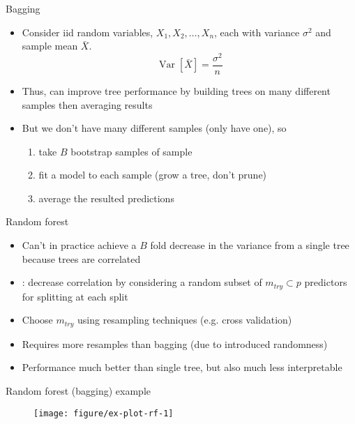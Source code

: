 \documentclass[handout]{beamer}
\begin{document}
\begin{frame}{Bagging}
  
  \begin{itemize}[<+->]
    \item Consider iid random variables, $X_{1}, X_{2}, \ldots, X_{n}$, each with variance $\sigma^2$ and sample mean $\bar{X}$.
  \begin{equation*}
    \operatorname{Var}[\bar{X}] = \frac{\sigma^2}{n}
  \end{equation*}
  \item Thus, can improve tree performance by building trees on many different samples then averaging results
  \item But we don't have many different samples (only have one), so
  \begin{enumerate}
    \item take $B$ bootstrap samples of sample
    \item fit a model to each sample (grow a tree, don't prune)
    \item average the resulted predictions 
  \end{enumerate}
  \end{itemize}
  
\end{frame}

\begin{frame}{Random forest}
  
  \begin{itemize}[<+->]
    \item Can't in practice achieve a $B$ fold decrease in the variance from a single tree because trees are correlated
    \item \textcite{rf}: decrease correlation by considering a random subset of $m_{try} \subset p$ predictors for splitting at each split
    \item Choose $m_{try}$ using resampling techniques (e.g. cross validation)
    \item Requires more resamples than bagging (due to introduced randomness)
    \item Performance much better than single tree, but also much less interpretable 
  \end{itemize}
\end{frame}

\begin{frame}{Random forest (bagging) example}
  
  \begin{figure}[!htb]
  \begin{center}
    \texttt{[image: figure/ex-plot-rf-1]}
  \end{center}
  \end{figure}
  
\end{frame}
\end{document}
